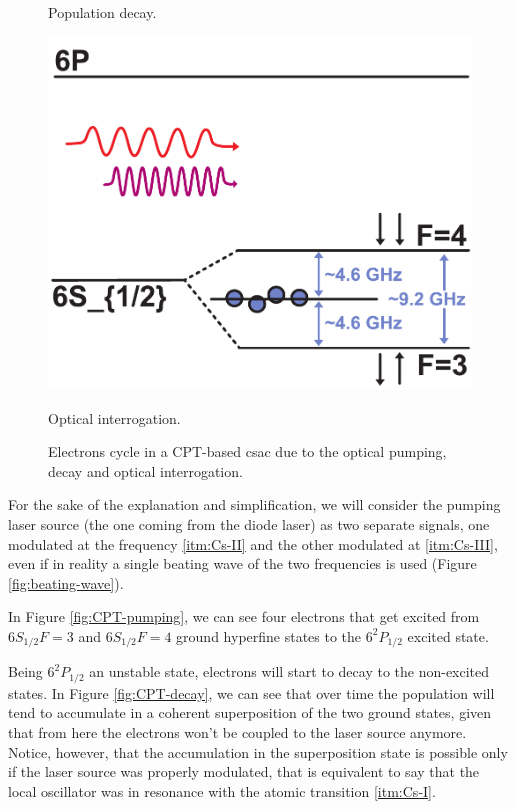 \begin{figure}[H]
\begin{minipage}[t]{0.3\linewidth}
        \caption{Population decay.}
        \label{fig:CPT-decay}
    \end{minipage}
    \hfill
    \begin{minipage}[t]{0.3\linewidth}
        \centering
        \includegraphics[width=\linewidth]{pdf/CPT/interrogation.pdf}
        \caption{Optical interrogation.}
        \label{fig:CPT-interrogation}
    \end{minipage}

    \caption{Electrons cycle in a CPT-based \acrshort{csac} due to the optical pumping, decay and optical interrogation.}
    \label{fig:CPT-steps}
\end{figure}

For the sake of the explanation and simplification, we will consider the pumping laser source (the one coming from the diode laser) as two separate signals, one modulated at the frequency \ref{itm:Cs-II} and the other modulated at \ref{itm:Cs-III}, even if in reality a single beating wave of the two frequencies is used (Figure \ref{fig:beating-wave}).

In Figure \ref{fig:CPT-pumping}, we can see four electrons that get excited from $6S_{1/2} F=3$ and $6S_{1/2} F=4$ ground hyperfine states to the $6^2P_{1/2}$ excited state.

Being $6^2P_{1/2}$ an unstable state, electrons will start to decay to the non-excited states.
In Figure \ref{fig:CPT-decay}, we can see that over time the population will tend to accumulate in a coherent superposition of the two ground states, given that from here the electrons won't be coupled to the laser source anymore.
Notice, however, that the accumulation in the superposition state is possible only if the laser source was properly modulated, that is equivalent to say that the local oscillator was in resonance with the atomic transition \ref{itm:Cs-I}.

